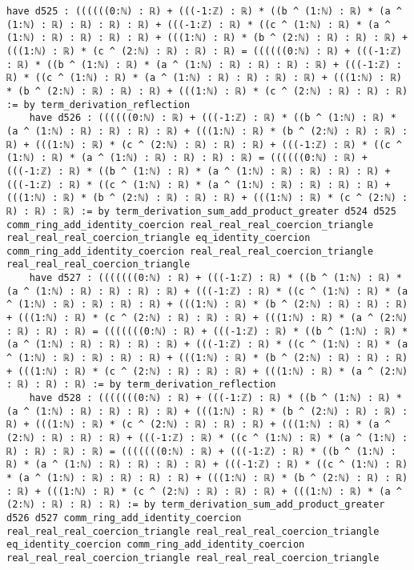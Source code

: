 \documentclass{article}
\begin{document}
\begin{tcolorbox}[colback=white!10, width=\linewidth]
\begin{lstlisting}[language=Lean4]
    have d525 : ((((((0:ℕ) : ℝ) + (((-1:ℤ) : ℝ) * ((b ^ (1:ℕ) : ℝ) * (a ^ (1:ℕ) : ℝ) : ℝ) : ℝ) : ℝ) + (((-1:ℤ) : ℝ) * ((c ^ (1:ℕ) : ℝ) * (a ^ (1:ℕ) : ℝ) : ℝ) : ℝ) : ℝ) + (((1:ℕ) : ℝ) * (b ^ (2:ℕ) : ℝ) : ℝ) : ℝ) + (((1:ℕ) : ℝ) * (c ^ (2:ℕ) : ℝ) : ℝ) : ℝ) = ((((((0:ℕ) : ℝ) + (((-1:ℤ) : ℝ) * ((b ^ (1:ℕ) : ℝ) * (a ^ (1:ℕ) : ℝ) : ℝ) : ℝ) : ℝ) + (((-1:ℤ) : ℝ) * ((c ^ (1:ℕ) : ℝ) * (a ^ (1:ℕ) : ℝ) : ℝ) : ℝ) : ℝ) + (((1:ℕ) : ℝ) * (b ^ (2:ℕ) : ℝ) : ℝ) : ℝ) + (((1:ℕ) : ℝ) * (c ^ (2:ℕ) : ℝ) : ℝ) : ℝ) := by term_derivation_reflection
    have d526 : ((((((0:ℕ) : ℝ) + (((-1:ℤ) : ℝ) * ((b ^ (1:ℕ) : ℝ) * (a ^ (1:ℕ) : ℝ) : ℝ) : ℝ) : ℝ) + (((1:ℕ) : ℝ) * (b ^ (2:ℕ) : ℝ) : ℝ) : ℝ) + (((1:ℕ) : ℝ) * (c ^ (2:ℕ) : ℝ) : ℝ) : ℝ) + (((-1:ℤ) : ℝ) * ((c ^ (1:ℕ) : ℝ) * (a ^ (1:ℕ) : ℝ) : ℝ) : ℝ) : ℝ) = ((((((0:ℕ) : ℝ) + (((-1:ℤ) : ℝ) * ((b ^ (1:ℕ) : ℝ) * (a ^ (1:ℕ) : ℝ) : ℝ) : ℝ) : ℝ) + (((-1:ℤ) : ℝ) * ((c ^ (1:ℕ) : ℝ) * (a ^ (1:ℕ) : ℝ) : ℝ) : ℝ) : ℝ) + (((1:ℕ) : ℝ) * (b ^ (2:ℕ) : ℝ) : ℝ) : ℝ) + (((1:ℕ) : ℝ) * (c ^ (2:ℕ) : ℝ) : ℝ) : ℝ) := by term_derivation_sum_add_product_greater d524 d525 comm_ring_add_identity_coercion real_real_real_coercion_triangle real_real_real_coercion_triangle eq_identity_coercion comm_ring_add_identity_coercion real_real_real_coercion_triangle real_real_real_coercion_triangle
    have d527 : (((((((0:ℕ) : ℝ) + (((-1:ℤ) : ℝ) * ((b ^ (1:ℕ) : ℝ) * (a ^ (1:ℕ) : ℝ) : ℝ) : ℝ) : ℝ) + (((-1:ℤ) : ℝ) * ((c ^ (1:ℕ) : ℝ) * (a ^ (1:ℕ) : ℝ) : ℝ) : ℝ) : ℝ) + (((1:ℕ) : ℝ) * (b ^ (2:ℕ) : ℝ) : ℝ) : ℝ) + (((1:ℕ) : ℝ) * (c ^ (2:ℕ) : ℝ) : ℝ) : ℝ) + (((1:ℕ) : ℝ) * (a ^ (2:ℕ) : ℝ) : ℝ) : ℝ) = (((((((0:ℕ) : ℝ) + (((-1:ℤ) : ℝ) * ((b ^ (1:ℕ) : ℝ) * (a ^ (1:ℕ) : ℝ) : ℝ) : ℝ) : ℝ) + (((-1:ℤ) : ℝ) * ((c ^ (1:ℕ) : ℝ) * (a ^ (1:ℕ) : ℝ) : ℝ) : ℝ) : ℝ) + (((1:ℕ) : ℝ) * (b ^ (2:ℕ) : ℝ) : ℝ) : ℝ) + (((1:ℕ) : ℝ) * (c ^ (2:ℕ) : ℝ) : ℝ) : ℝ) + (((1:ℕ) : ℝ) * (a ^ (2:ℕ) : ℝ) : ℝ) : ℝ) := by term_derivation_reflection
    have d528 : (((((((0:ℕ) : ℝ) + (((-1:ℤ) : ℝ) * ((b ^ (1:ℕ) : ℝ) * (a ^ (1:ℕ) : ℝ) : ℝ) : ℝ) : ℝ) + (((1:ℕ) : ℝ) * (b ^ (2:ℕ) : ℝ) : ℝ) : ℝ) + (((1:ℕ) : ℝ) * (c ^ (2:ℕ) : ℝ) : ℝ) : ℝ) + (((1:ℕ) : ℝ) * (a ^ (2:ℕ) : ℝ) : ℝ) : ℝ) + (((-1:ℤ) : ℝ) * ((c ^ (1:ℕ) : ℝ) * (a ^ (1:ℕ) : ℝ) : ℝ) : ℝ) : ℝ) = (((((((0:ℕ) : ℝ) + (((-1:ℤ) : ℝ) * ((b ^ (1:ℕ) : ℝ) * (a ^ (1:ℕ) : ℝ) : ℝ) : ℝ) : ℝ) + (((-1:ℤ) : ℝ) * ((c ^ (1:ℕ) : ℝ) * (a ^ (1:ℕ) : ℝ) : ℝ) : ℝ) : ℝ) + (((1:ℕ) : ℝ) * (b ^ (2:ℕ) : ℝ) : ℝ) : ℝ) + (((1:ℕ) : ℝ) * (c ^ (2:ℕ) : ℝ) : ℝ) : ℝ) + (((1:ℕ) : ℝ) * (a ^ (2:ℕ) : ℝ) : ℝ) : ℝ) := by term_derivation_sum_add_product_greater d526 d527 comm_ring_add_identity_coercion real_real_real_coercion_triangle real_real_real_coercion_triangle eq_identity_coercion comm_ring_add_identity_coercion real_real_real_coercion_triangle real_real_real_coercion_triangle

\end{lstlisting}
\end{tcolorbox}
\end{document}
